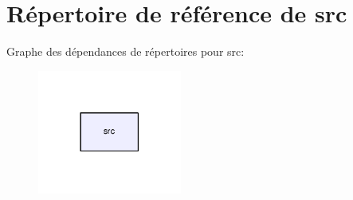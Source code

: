 \section{Répertoire de référence de src}
\label{dir_68267d1309a1af8e8297ef4c3efbcdba}
Graphe des dépendances de répertoires pour src\-:\nopagebreak
\begin{figure}[H]
\begin{center}
\leavevmode
\includegraphics[width=134pt]{dir_68267d1309a1af8e8297ef4c3efbcdba_dep}
\end{center}
\end{figure}
